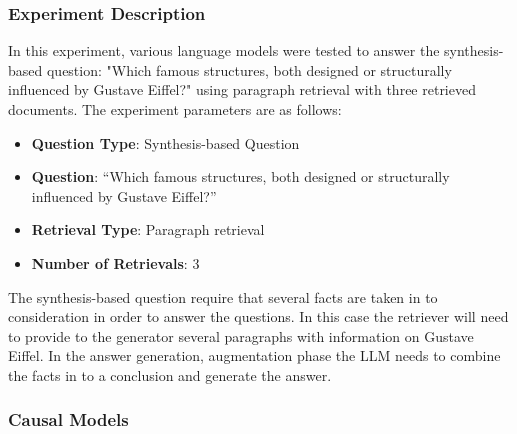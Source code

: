 \documentclass{wseas}
\begin{document}
\subsubsection{Experiment Description}

In this experiment, various language models were tested to answer the
synthesis-based question: "Which famous structures, both designed or
structurally influenced by Gustave Eiffel?" using paragraph retrieval
with three retrieved documents. The experiment parameters are as
follows:

\begin{itemize}

\item
  \textbf{Question Type}: Synthesis-based Question
\item
  \textbf{Question}: ``Which famous structures, both designed or
  structurally influenced by Gustave Eiffel?''
\item
  \textbf{Retrieval Type}: Paragraph retrieval
\item
  \textbf{Number of Retrievals}: 3
\end{itemize}

The synthesis-based question require that several facts are taken in to
consideration in order to answer the questions. In this case the
retriever will need to provide to the generator several paragraphs with
information on Gustave Eiffel. In the answer generation, augmentation phase 
the LLM needs to combine the facts in to a conclusion and generate the answer.

\subsubsection{Causal Models}

\end{document}
